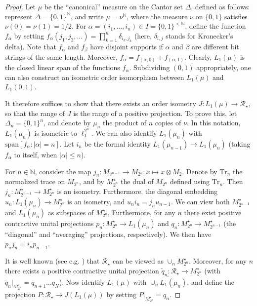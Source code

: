 \documentclass[12pt]{amsart}
\theoremstyle{plain}
\theoremstyle{definition}
\renewcommand{\leq}{\leqslant}
\newcommand{\one}{\mathbf{1}}
\newcommand{\N}{\mathbb N}
\def \tr{{\mathrm{Tr}} }
\renewcommand{\span}{\mathrm{span}}
\begin{document}
\begin{proof}
Let $\mu$ be the ``canonical'' measure on the Cantor set $\Delta$, defined
as follows: represent $\Delta = \{0,1\}^\N$, and write $\mu = \nu^\N$,
where the measure $\nu$ on $\{0,1\}$ satisfies $\nu(0) = \nu(1) = 1/2$.
For $\alpha = (i_1, \ldots, i_n) \in I = \{0,1\}^{< \N}$, define the function
$f_\alpha$ by setting %
$f_\alpha(j_1, j_2, \ldots) = \prod_{k=1}^n \delta_{i_k,j_k}$
(here, $\delta_{i,j}$ stands for Kronecker's delta).
Note that $f_\alpha$ and $f_\beta$ have disjoint supports if $\alpha$
and $\beta$ are different bit strings of the same length.
Moreover, $f_\alpha = f_{(\alpha,0)} + f_{(\alpha,1)}$.
Clearly, $L_1(\mu)$ is the closed linear span of the functions $f_\alpha$.
Subdividing $(0,1)$ appropriately, one can also construct an isometric
order isomorphism between $L_1(\mu)$ and $L_1(0,1)$.

It therefore suffices to show that there exists an order isometry
$J : L_1(\mu) \to {\mathcal{R}}_\star$, so that the range of $J$
is the range of a positive projection.
To prove this, let $\Delta_n = \{0,1\}^n$, and denote by $\mu_n$ the
product of $n$ copies of $\nu$. In this notation, $L_1(\mu_n)$ is
isometric to $\ell_1^{2^n}$. We can also identify $L_1(\mu_n)$ with
$\span[f_\alpha : |\alpha| = n]$. Let
$i_n$ be the formal identity $L_1(\mu_{n-1}) \to L_1(\mu_n)$
(taking $f_\alpha$ to itself, when $|\alpha| \leq n$).

For $n \in \N$, consider the map
$j_n : M_{2^{n-1}} \to M_{2^n} : x \mapsto x \otimes M_2$.
Denote by $\tr_n$ the normalized trace on $M_{2^n}$, and
by $M_{2^n}^\star$ the dual of $M_{2^n}$ defined using $\tr_n$.
Then $j_n : M_{2^{n-1}}^\star \to M_{2^n}^\star$ is an isometry.
Furthermore, the diagonal embedding
$u_n : L_1(\mu_n) \to M_{2^n}^\star$ is an isometry, and
$u_n i_n = j_n u_{n-1}$. We can view both
$M_{2^{n-1}}^\star$ and $L_1(\mu_n)$ as subspaces of $M_{2^n}^\star$,
Furthermore, for any $n$ there exist positive contractive
unital projections $p_n : M_{2^n}^\star \to L_1(\mu_n)$ and
$q_n : M_{2^n}^\star \to M_{2^{n-1}}^\star$ (the ``diagonal''
and ``averaging'' projections, respectively). We then have
$p_n j_n = i_n p_{n-1}$.

It is well known (see e.g. \cite[Theorem 3.4]{PiLP}) that
${\mathcal{R}}_\star$ can be viewed as $\overline{\cup_n M_{2^n}^\star}$.
Moreover, for any $n$ there exists a positive contractive
unital projection $\tilde{q}_n : {\mathcal{R}}_\star \to M_{2^n}^\star$
(with $\tilde{q}_n|_{M_{2^n}^\star} = q_{n+1} \ldots q_N$). 
Now identify $L_1(\mu)$ with $\overline{\cup_n L_1(\mu_n)}$,
and define the projection $P : {\mathcal{R}}_\star \to J(L_1(\mu))$
by setting $P|_{M_{2^n}^\star} = q_n$.
\end{proof}
\end{document}
